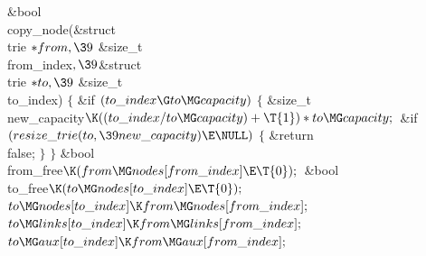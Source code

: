 \Y\B\1\1\&{bool} \\{copy\_node}(\&{struct} \\{trie} ${}{*}\\{from},\39{}$%
\&{size\_t} \\{from\_index}${},\39{}$\&{struct} \\{trie} ${}{*}\\{to},\39{}$%
\&{size\_t} \\{to\_index})\2\2\6
${}\{{}$\1\6
\&{if} ${}(\\{to\_index}\G\\{to}\MG\\{capacity}){}$\5
${}\{{}$\1\6
\&{size\_t} \\{new\_capacity}${}\K((\\{to\_index}/\\{to}\MG\\{capacity})+%
\T{1})*\\{to}\MG\\{capacity};{}$\7
\&{if} ${}(\\{resize\_trie}(\\{to},\39\\{new\_capacity})\E\NULL){}$\5
${}\{{}$\1\6
\&{return} \\{false};\6
\4${}\}{}$\2\6
\4${}\}{}$\2\7
\&{bool} \\{from\_free}${}\K(\\{from}\MG\\{nodes}[\\{from\_index}]\E\T{0});{}$\6
\&{bool} \\{to\_free}${}\K(\\{to}\MG\\{nodes}[\\{to\_index}]\E\T{0});{}$\7
${}\\{to}\MG\\{nodes}[\\{to\_index}]\K\\{from}\MG\\{nodes}[\\{from\_index}];{}$%
\6
${}\\{to}\MG\\{links}[\\{to\_index}]\K\\{from}\MG\\{links}[\\{from\_index}];{}$%
\6
${}\\{to}\MG\\{aux}[\\{to\_index}]\K\\{from}\MG\\{aux}[\\{from\_index}];{}$\6
